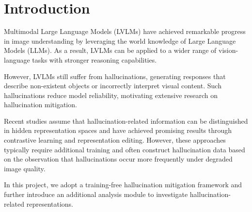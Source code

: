 \section{Introduction}
Multimodal Large Language Models (LVLMs) have achieved remarkable progress in image understanding by leveraging the world knowledge of Large Language Models (LLMs). As a result, LVLMs can be applied to a wider range of vision-language tasks with stronger reasoning capabilities.

However, LVLMs still suffer from hallucinations, generating responses that describe non-existent objects or incorrectly interpret visual content. Such hallucinations reduce model reliability, motivating extensive research on hallucination mitigation.

Recent studies assume that hallucination-related information can be distinguished in hidden representation spaces and have achieved promising results through contrastive learning and representation editing. However, these approaches typically require additional training and often construct hallucination data based on the observation that hallucinations occur more frequently under degraded image quality.

In this project, we adopt a training-free hallucination mitigation framework and further introduce an additional analysis module to investigate hallucination-related representations. 